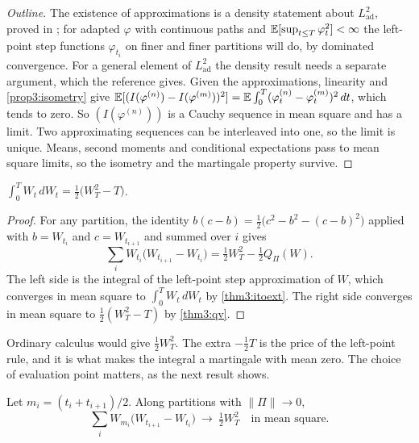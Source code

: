 \begin{chapterrefs}
\begin{proof}[Outline]
The existence of approximations is a density statement about $L^2_{\mathrm{ad}}$, proved in
\textcite[Section~3.2]{karatzas1998}; for adapted $\varphi$ with continuous paths and $\mathbb{E}[\sup_{t\le T}\varphi_t^2]<\infty$
the left-point step functions $\varphi_{t_i}$ on finer and finer partitions will do, by dominated
convergence. For a general element of $L^2_{\mathrm{ad}}$ the density result needs a separate
argument, which the reference gives. Given the approximations, linearity and
\cref{prop3:isometry} give
$\mathbb{E}[(I(\varphi^{(n)})-I(\varphi^{(m)}))^2]=\mathbb{E}\int_0^T(\varphi^{(n)}_t-\varphi^{(m)}_t)^2\,dt$, which tends to
zero. So $(I(\varphi^{(n)}))$ is a Cauchy sequence in mean square and has a limit. Two approximating
sequences can be interleaved into one, so the limit is unique. Means, second moments and conditional
expectations pass to mean square limits, so the isometry and the martingale property survive.
\end{proof}

\begin{proposition}\label{prop3:wdw}
$\displaystyle\int_0^T W_t\,dW_t = \tfrac12\bigl(W_T^2-T\bigr)$.
\end{proposition}

\begin{proof}
For any partition, the identity $b(c-b)=\tfrac12\bigl(c^2-b^2-(c-b)^2\bigr)$ applied with $b=W_{t_i}$
and $c=W_{t_{i+1}}$ and summed over $i$ gives
\begin{equation}\label{eq3:telescope}
  \sum_i W_{t_i}\bigl(W_{t_{i+1}}-W_{t_i}\bigr) = \tfrac12 W_T^2 - \tfrac12 Q_\Pi(W) .
\end{equation}
The left side is the integral of the left-point step approximation of $W$, which converges in mean
square to $\int_0^TW_t\,dW_t$ by \cref{thm3:itoext}. The right side converges in mean square to
$\tfrac12(W_T^2-T)$ by \cref{thm3:qv}.
\end{proof}

Ordinary calculus would give $\tfrac12 W_T^2$. The extra $-\tfrac12T$ is the price of the left-point
rule, and it is what makes the integral a martingale with mean zero. The choice of evaluation point
matters, as the next result shows.

\begin{proposition}\label{prop3:strat}
Let $m_i=(t_i+t_{i+1})/2$. Along partitions with $\lVert\Pi\rVert\to0$,
\begin{equation}\label{eq3:strat}
  \sum_i W_{m_i}\bigl(W_{t_{i+1}}-W_{t_i}\bigr)\ \longrightarrow\ \tfrac12 W_T^2
  \quad\text{in mean square.}
\end{equation}
\end{proposition}


\end{chapterrefs}
